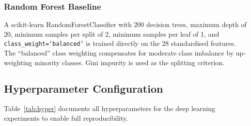 \documentclass[conference]{IEEEtran}
\begin{document}
\subsubsection{Random Forest Baseline}

A scikit-learn RandomForestClassifier with 200 decision trees, maximum depth
of 20, minimum samples per split of 2, minimum samples per leaf of 1, and
\texttt{class\_weight=`balanced'} is trained directly on the 28 standardised
features. The ``balanced'' class weighting compensates for moderate class
imbalance by up-weighting minority classes. Gini impurity is used as the
splitting criterion.

\subsection{Hyperparameter Configuration}
\label{ssec:hyper}

Table~\ref{tab:hyper} documents all hyperparameters for the deep learning
experiments to enable full reproducibility.
\end{document}
